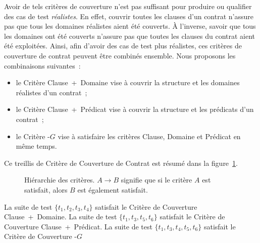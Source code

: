 Avoir de tels critères de couverture n'est pas suffisant pour produire ou
qualifier des cas de test {\em réalistes}. En effet, couvrir toutes les clauses
d'un contrat n'assure pas que tous les domaines réalistes aient été couverts. À
l'inverse, savoir que tous les domaines ont été couverts n'assure pas que toutes
les clauses du contrat aient été exploitées. Ainsi, afin d'avoir des cas de test
plus réalistes, ces critères de couverture de contrat peuvent être combinés
ensemble.  Nous proposons les combinaisons suivantes~:
%
\begin{itemize}

\item le Critère Clause~+~Domaine vise à couvrir la structure et les domaines
réalistes d'un contrat~;

\item le Critère Clause~+~Prédicat vise à couvrir la structure et les prédicats
d'un contrat~;

\item le Critère -$G$ vise à satisfaire les critères Clause,
Domaine et Prédicat en même temps.

\end{itemize}
%
Ce {\strong treillis} de Critère de Couverture de Contrat est résumé dans la
figure~\ref{figure:test:lattice}.

\begin{figure}


\caption{\label{figure:test:lattice} Hiérarchie des critères. $A \rightarrow B$
signifie que si le critère $A$ est satisfait, alors $B$ est également
satisfait.}

\end{figure}

\begin{example}

La suite de test $\{t_1, t_2, t_3, t_4\}$ satisfait le Critère de Couverture
Clause~+~Domaine. La suite de test $\{t_1, t_3, t_5, t_6\}$ satisfait le Critère
de Couverture Clause~+~Prédicat. La suite de test $\{t_1, t_3, t_4, t_5, t_6\}$
satisfait le Critère de Couverture -$G$

\end{example}
